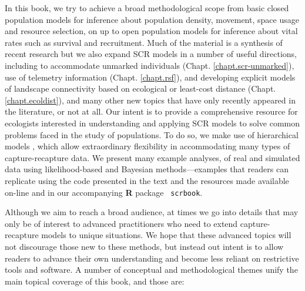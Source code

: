 In this book, we try to achieve a broad methodological scope from
basic closed population models %
for inference about population density, movement, space usage and resource
selection, on up to open population models for inference about vital
rates such as survival and recruitment. %
Much of the material is a synthesis of recent research but we also
expand SCR models in a number of useful directions, including to
accommodate unmarked individuals (Chapt. \ref{chapt.scr-unmarked}),
use of telemetry information (Chapt. \ref{chapt.rsf}), and developing
explicit models of landscape connectivity based on ecological or
least-cost distance (Chapt. \ref{chapt.ecoldist}), and many other new
topics that have only recently appeared in the literature, or not at all.  Our intent
is to provide a comprehensive resource for ecologists interested in
understanding and applying SCR models to solve common problems faced
in the study of populations.  To do so, we make use of hierarchical
models \citep{royle_dorazio:2008}, which allow extraordinary
flexibility in accommodating many types of capture-recapture data. We
present many example analyses, of real and simulated data using
likelihood-based and Bayesian methods---examples that readers can
replicate using the code presented in the text and the resources made
available on-line and in our accompanying {\bf R} package {\tt
  scrbook}.

Although we aim to reach a broad audience, at times we go into details
that may only be of interest to advanced practitioners who need to
extend capture-recapture models to unique situations.  We hope that
these advanced topics will not discourage those new to these methods,
but instead out intent is to allow readers to advance their own
understanding and become less reliant on restrictive tools and
software.
A number of conceptual and methodological
themes unify the main topical coverage of this book, and those are:


